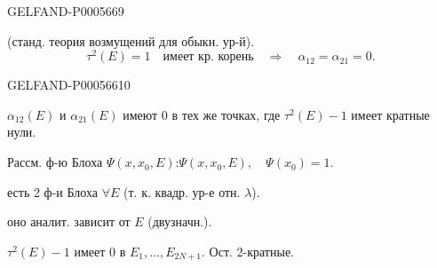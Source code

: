 \begin{GelfandAdjacentEvidence}{GELFAND-P000566}{9}

(станд. теория возмущений для обыкн. ур-й).
\[
\tau^2(E)=1\quad\text{имеет кр. корень}\quad\Rightarrow\quad\alpha_{12}=\alpha_{21}=0.
\]
\end{GelfandAdjacentEvidence}
\begin{GelfandAdjacentEvidence}{GELFAND-P000566}{10}

\(\alpha_{12}(E)\) и \(\alpha_{21}(E)\) имеют 0 в тех же точках, где \(\tau^2(E)-1\) имеет кратные нули.

Рассм. ф-ю Блоха \(\Psi(x,x_0,E)\):\qquad \(\Psi(x,x_0,E),\quad\Psi(x_0)=1.\)

есть 2 ф-и Блоха \(\forall E\) (т. к. квадр. ур-е отн. \(\lambda\)).

оно аналит. зависит от \(E\) (двузначн.).
\end{GelfandAdjacentEvidence}

\(\tau^2(E)-1\) имеет 0 в \(E_1,\ldots,E_{2N+1}\). Ост. 2-кратные.


